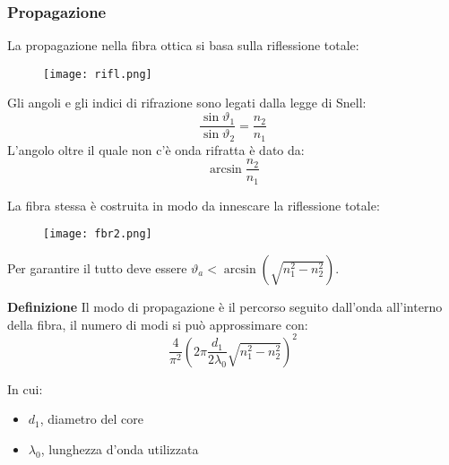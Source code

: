 \documentclass{article}
\newcommand{\df}{\noindent\textbf{Definizione} }
\begin{document}
\subsubsection{Propagazione}

La propagazione nella fibra ottica si basa sulla riflessione totale:

\begin{figure}[ht]
    \centering
    \texttt{[image: rifl.png]}
\end{figure}

\noindent Gli angoli e gli indici di rifrazione sono legati dalla legge di Snell:
$$\frac{\sin\vartheta_1}{\sin\vartheta_2}=\frac{n_2}{n_1}$$
\noindent L'angolo oltre il quale non c'è onda rifratta è dato da:
$$\arcsin\frac{n_2}{n_1}$$\newline

\noindent La fibra stessa è costruita in modo da innescare la riflessione totale:

\begin{figure}[ht]
    \centering
    \texttt{[image: fbr2.png]}
\end{figure}

\noindent Per garantire il tutto deve essere $\vartheta_a<\arcsin(\sqrt{n_1^2-n_2^2})$.\newline

\df Il modo di propagazione è il percorso seguito dall'onda all'interno della fibra, il numero di modi si può approssimare con:
$$\frac{4}{\pi^2}\left(2\pi\frac{d_1}{2\lambda_0}\sqrt{n_1^2-n_2^2}\right)^2$$

\noindent In cui:
\begin{itemize}
    \item $d_1$, diametro del core
    \item $\lambda_0$, lunghezza d'onda utilizzata\newline
\end{itemize}
\end{document}

